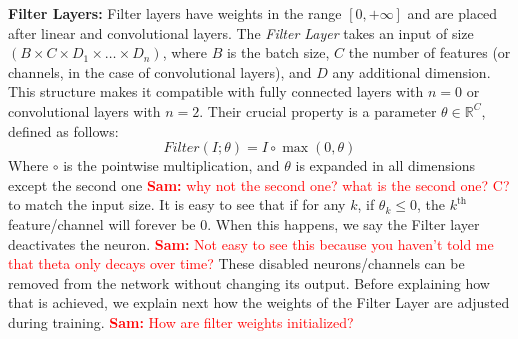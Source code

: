 \documentclass[sigconf]{acmart}
\newcommand{\srm}[1]{\textcolor{red}{{\bf Sam:} #1}}
\newcommand{\gl}[1]{\textcolor{violet}{{\bf Gl:} #1}}
\begin{document}
\textbf{Filter Layers: } Filter layers have weights in the range $[0,+\infty]$ and are placed after
linear and convolutional layers.
The \textit{Filter Layer} takes an input of size $\left(B \times C \times D_1
\times \dots \times D_n\right)$, where $B$ is the batch size, $C$ the number of
features (or channels, in the case of convolutional layers), and $D$ any additional dimension. This structure makes
it compatible with fully connected layers with $n=0$ or convolutional layers
with $n=2$. Their crucial property is a parameter $\theta \in \mathbb{R}^C$,
defined as follows:
\vspace{-1em}
\begin{equation} Filter(I;\theta) = I \circ \max(0, \theta) \end{equation}
Where $\circ$ is the 
pointwise multiplication,
and $\theta$ is expanded in all
dimensions except the second one \srm{why not the second one? what is the second one?  C?} to match the input size. It is easy to see
that if for any $k$, if $\theta_k \leq 0$, the $k^{\text{th}}$ feature/channel
will forever be $0$. When this happens, we say the Filter layer deactivates the
neuron. \srm{Not easy to see this because you haven't told me that theta only decays over time?} These disabled neurons/channels can be removed from the network without
changing its output. Before explaining how that is achieved, we 
explain
next how the weights of the Filter Layer are adjusted during training. \srm{How are filter weights initialized?}



%
%
%
\end{document}
